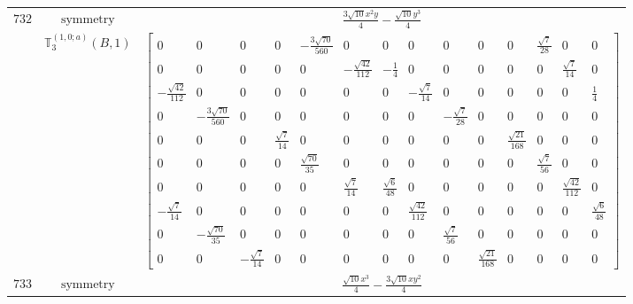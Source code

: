\documentclass[fleqn,8pt,landscape]{jsarticle}
\begin{document}
\begin{longtable}{ccc}
$ 732 $ & $ \text{symmetry} $ & $ \frac{3 \sqrt{10} x^{2} y}{4} - \frac{\sqrt{10} y^{3}}{4} $ \\
$  $ & $ \mathbb{T}_{3}^{(1,0;a)}(B,1) $ & $ \begin{bmatrix} 0 & 0 & 0 & 0 & - \frac{3 \sqrt{70}}{560} & 0 & 0 & 0 & 0 & 0 & 0 & \frac{\sqrt{7}}{28} & 0 & 0 \\ 0 & 0 & 0 & 0 & 0 & - \frac{\sqrt{42}}{112} & - \frac{1}{4} & 0 & 0 & 0 & 0 & 0 & \frac{\sqrt{7}}{14} & 0 \\ - \frac{\sqrt{42}}{112} & 0 & 0 & 0 & 0 & 0 & 0 & - \frac{\sqrt{7}}{14} & 0 & 0 & 0 & 0 & 0 & \frac{1}{4} \\ 0 & - \frac{3 \sqrt{70}}{560} & 0 & 0 & 0 & 0 & 0 & 0 & - \frac{\sqrt{7}}{28} & 0 & 0 & 0 & 0 & 0 \\ 0 & 0 & 0 & \frac{\sqrt{7}}{14} & 0 & 0 & 0 & 0 & 0 & 0 & \frac{\sqrt{21}}{168} & 0 & 0 & 0 \\ 0 & 0 & 0 & 0 & \frac{\sqrt{70}}{35} & 0 & 0 & 0 & 0 & 0 & 0 & \frac{\sqrt{7}}{56} & 0 & 0 \\ 0 & 0 & 0 & 0 & 0 & \frac{\sqrt{7}}{14} & \frac{\sqrt{6}}{48} & 0 & 0 & 0 & 0 & 0 & \frac{\sqrt{42}}{112} & 0 \\ - \frac{\sqrt{7}}{14} & 0 & 0 & 0 & 0 & 0 & 0 & \frac{\sqrt{42}}{112} & 0 & 0 & 0 & 0 & 0 & \frac{\sqrt{6}}{48} \\ 0 & - \frac{\sqrt{70}}{35} & 0 & 0 & 0 & 0 & 0 & 0 & \frac{\sqrt{7}}{56} & 0 & 0 & 0 & 0 & 0 \\ 0 & 0 & - \frac{\sqrt{7}}{14} & 0 & 0 & 0 & 0 & 0 & 0 & \frac{\sqrt{21}}{168} & 0 & 0 & 0 & 0 \end{bmatrix} $ \\ \hline
$ 733 $ & $ \text{symmetry} $ & $ \frac{\sqrt{10} x^{3}}{4} - \frac{3 \sqrt{10} x y^{2}}{4} $ \\

\end{longtable}
\end{document}
